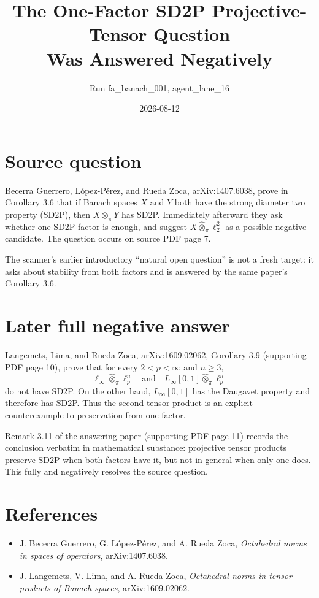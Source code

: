 \documentclass[11pt]{article}
\title{The One-Factor SD2P Projective-Tensor Question\\Was Answered Negatively}
\author{Run fa\_banach\_001, agent\_lane\_16}
\date{2026-08-12}
\begin{document}
\maketitle

\section*{Source question}

Becerra Guerrero, L\'opez-P\'erez, and Rueda Zoca,
arXiv:1407.6038, prove in Corollary 3.6 that if Banach spaces $X$ and
$Y$ both have the strong diameter two property (SD2P), then
$X\widehat\otimes_\pi Y$ has SD2P.  Immediately afterward they ask whether
one SD2P factor is enough, and suggest
$X\widehat\otimes_\pi\ell_2^2$ as a possible negative candidate.  The
question occurs on source PDF page 7.

The scanner's earlier introductory ``natural open question'' is not a fresh
target: it asks about stability from both factors and is answered by the same
paper's Corollary 3.6.

\section*{Later full negative answer}

Langemets, Lima, and Rueda Zoca, arXiv:1609.02062, Corollary 3.9
(supporting PDF page 10), prove that for every $2<p<\infty$ and $n\ge3$,
\[
 \ell_\infty\widehat\otimes_\pi\ell_p^n
 \quad\text{and}\quad
 L_\infty[0,1]\widehat\otimes_\pi\ell_p^n
\]
do not have SD2P.  On the other hand, $L_\infty[0,1]$ has the Daugavet
property and therefore has SD2P.  Thus the second tensor product is an
explicit counterexample to preservation from one factor.

Remark 3.11 of the answering paper (supporting PDF page 11) records the
conclusion verbatim in mathematical substance: projective tensor products
preserve SD2P when both factors have it, but not in general when only one
does.  This fully and negatively resolves the source question.

\section*{References}

\begin{itemize}
\item J. Becerra Guerrero, G. L\'opez-P\'erez, and A. Rueda Zoca,
\emph{Octahedral norms in spaces of operators}, arXiv:1407.6038.
\item J. Langemets, V. Lima, and A. Rueda Zoca,
\emph{Octahedral norms in tensor products of Banach spaces},
arXiv:1609.02062.
\end{itemize}
\end{document}
